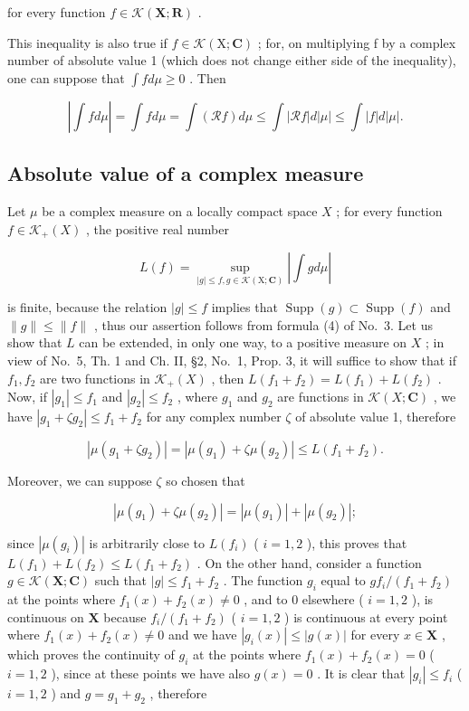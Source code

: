 for every function \(f \in \mathcal{K}(\mathbf{X};\mathbf{R})\) .

This inequality is also true if \(f \in \mathcal{K}(\mathrm{X};\mathbf{C})\) ; for, on multiplying f by a complex number of absolute value 1 (which does not change either side of the inequality), one can suppose that \(\int f d\mu \geqslant 0\) . Then

\[
\left| \int f d \mu \right| = \int f d \mu = \int (\mathcal {R} f) d \mu \leqslant \int | \mathcal {R} f | d | \mu | \leqslant \int | f | d | \mu |.
\]

\subsection{Absolute value of a complex measure}

Let \(\mu\) be a complex measure on a locally compact space \(X\) ; for every function \(f \in \mathcal{K}_{+}(X)\) , the positive real number

\[
L (f) = \sup _ {| g | \leqslant f, g \in \mathcal {K} (\mathrm{X}; \mathbf {C})} \left| \int g d \mu \right|\tag{11}
\]

is finite, because the relation \(|g| \leqslant f\) implies that \(\operatorname{Supp}(g) \subset \operatorname{Supp}(f)\) and \(\| g \| \leqslant \| f \|\) , thus our assertion follows from formula (4) of No.~3. Let us show that \(L\) can be extended, in only one way, to a positive measure on \(X\) ; in view of No.~5, Th. 1 and Ch. II, §2, No.~1, Prop. 3, it will suffice to show that if \(f_1, f_2\) are two functions in \(\mathcal{K}_+(X)\) , then \(L(f_1 + f_2) = L(f_1) + L(f_2)\) . Now, if \(|g_1| \leqslant f_1\) and \(|g_2| \leqslant f_2\) , where \(g_1\) and \(g_2\) are functions in \(\mathcal{K}(X; \mathbf{C})\) , we have \(|g_1 + \zeta g_2| \leqslant f_1 + f_2\) for any complex number \(\zeta\) of absolute value 1, therefore

\[
\left| \mu (g _ {1} + \zeta g _ {2}) \right| = \left| \mu (g _ {1}) + \zeta \mu (g _ {2}) \right| \leqslant L (f _ {1} + f _ {2}).
\]

Moreover, we can suppose \(\zeta\) so chosen that

\[
\left| \mu (g _ {1}) + \zeta \mu (g _ {2}) \right| = \left| \mu (g _ {1}) \right| + \left| \mu (g _ {2}) \right|;
\]

since \(|\mu(g_i)|\) is arbitrarily close to \(L(f_i)\) ( \(i = 1,2\) ), this proves that \(L(f_1) + L(f_2) \leqslant L(f_1 + f_2)\) . On the other hand, consider a function \(g \in \mathcal{K}(\mathbf{X};\mathbf{C})\) such that \(|g| \leqslant f_1 + f_2\) . The function \(g_i\) equal to \(g f_i / (f_1 + f_2)\) at the points where \(f_1(x) + f_2(x) \neq 0\) , and to 0 elsewhere ( \(i = 1,2\) ), is continuous on \(\mathbf{X}\) because \(f_i / (f_1 + f_2)\) ( \(i = 1,2\) ) is continuous at every point where \(f_1(x) + f_2(x) \neq 0\) and we have \(|g_i(x)| \leqslant |g(x)|\) for every \(x \in \mathbf{X}\) , which proves the continuity of \(g_i\) at the points where \(f_1(x) + f_2(x) = 0\) ( \(i = 1,2\) ), since at these points we have also \(g(x) = 0\) . It is clear that \(|g_i| \leqslant f_i\) ( \(i = 1,2\) ) and \(g = g_1 + g_2\) , therefore

